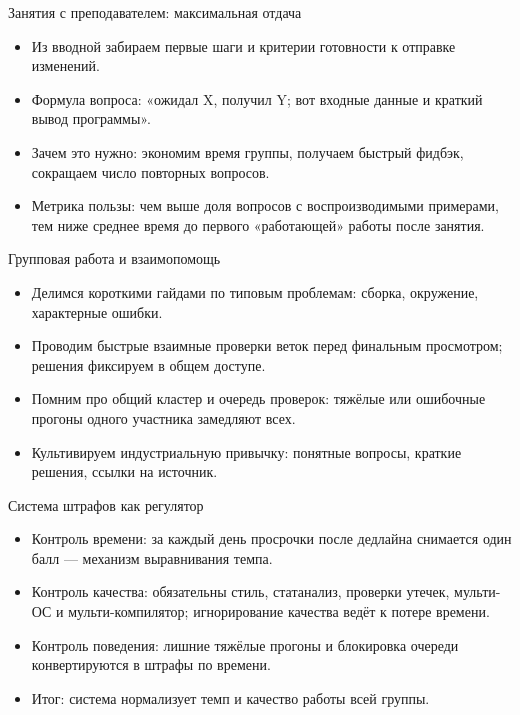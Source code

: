 \documentclass{beamer}
\begin{document}
\begin{frame}{Занятия с преподавателем: максимальная отдача}
  \begin{itemize}
    \item Из вводной забираем первые шаги и критерии готовности к отправке изменений.
    \item Формула вопроса: «ожидал X, получил Y; вот входные данные и краткий вывод программы».
    \item Зачем это нужно: экономим время группы, получаем быстрый фидбэк, сокращаем число повторных вопросов.
    \item Метрика пользы: чем выше доля вопросов с воспроизводимыми примерами, тем ниже среднее время до первого «работающей» работы после занятия.
  \end{itemize}
\end{frame}

\begin{frame}{Групповая работа и взаимопомощь}
  \begin{itemize}
    \item Делимся короткими гайдами по типовым проблемам: сборка, окружение, характерные ошибки.
    \item Проводим быстрые взаимные проверки веток перед финальным просмотром; решения фиксируем в общем доступе.
    \item Помним про общий кластер и очередь проверок: тяжёлые или ошибочные прогоны одного участника замедляют всех.
    \item Культивируем индустриальную привычку: понятные вопросы, краткие решения, ссылки на источник.
  \end{itemize}
\end{frame}

\begin{frame}{Система штрафов как регулятор}
  \begin{itemize}
    \item Контроль времени: за каждый день просрочки после дедлайна снимается один балл — механизм выравнивания темпа.
    \item Контроль качества: обязательны стиль, статанализ, проверки утечек, мульти-ОС и мульти-компилятор; игнорирование качества ведёт к потере времени.
    \item Контроль поведения: лишние тяжёлые прогоны и блокировка очереди конвертируются в штрафы по времени.
    \item Итог: система нормализует темп и качество работы всей группы.
  \end{itemize}
\end{frame}
\end{document}
